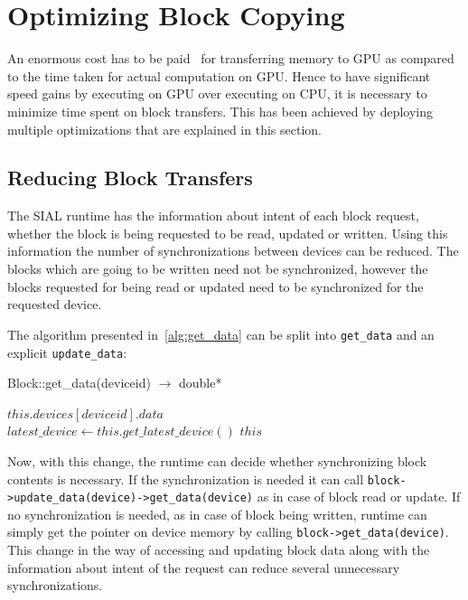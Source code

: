 \section{Optimizing Block Copying}
An enormous cost has to be paid~\cite{Bakkum2010}\cite{memorytransferoverhead}
for transferring memory to GPU as compared to the time taken for actual computation
on GPU. Hence to have significant speed gains by executing on GPU over executing
on CPU, it is necessary to minimize time spent on block transfers. This has been
achieved by deploying multiple optimizations that are explained in this section.

\subsection{Reducing Block Transfers}
The SIAL runtime has the information about intent of each block request, whether
the block is being requested to be read, updated or written. Using this information the
number of synchronizations between devices can be reduced. The blocks which are
going to be written need not be synchronized, however the blocks requested for
being read or updated need to be synchronized for the requested device.

The algorithm presented in~\ref{alg:get_data} can be split into
\texttt{get\_data} and an explicit \texttt{update\_data}:

\begin{algorithm}  {Block::get\_data(deviceid) $\rightarrow$ double*}
  \singlespacing

  \begin{algorithmic}[1]
    \State \Return $this.devices[deviceid].data$
    \EndFunction
    \\
    \State $latest\_device \gets this.get\_latest\_device()$
    \EndIf
    \State \Return $this$
    \EndFunction
  \end{algorithmic}
\end{algorithm}

Now, with this change, the runtime can decide whether synchronizing block contents
is necessary. If the synchronization is needed it can call
\texttt{block->update\_data(device)->get\_data(device)}
as in case of block read or update. If no synchronization is needed, as in case
of block being written, runtime can simply get the pointer on device memory by calling
\texttt{block->get\_data(device)}.
This change in the way of accessing and updating block data along with the information
about intent of the request can reduce several unnecessary synchronizations.

